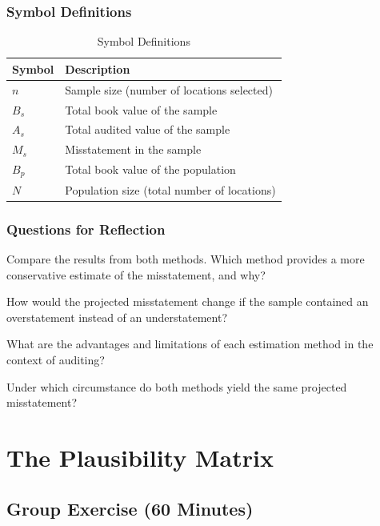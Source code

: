 \documentclass[11pt,a4paper,openany]{memoir}
\begin{document}
\subsection*{Symbol Definitions}
\begin{table}[htbp]
\centering
\caption{Symbol Definitions}
\label{tab:symbol_definitions}
\begin{tabularx}{\textwidth}{@{}lX@{}}
\toprule
\textbf{Symbol} & \textbf{Description} \\
\midrule
$n$ & Sample size (number of locations selected) \\
$B_s$ & Total book value of the sample \\
$A_s$ & Total audited value of the sample \\
$M_s$ & Misstatement in the sample \\
$B_p$ & Total book value of the population \\
$N$ & Population size (total number of locations) \\
\bottomrule
\end{tabularx}
\end{table}

\subsection*{Questions for Reflection}
\begin{compactitem}
    \item Compare the results from both methods. Which method provides a more conservative estimate of the misstatement, and why?
    \item How would the projected misstatement change if the sample contained an overstatement instead of an understatement?
    \item What are the advantages and limitations of each estimation method in the context of auditing?
    \item Under which circumstance do both methods yield the same projected misstatement?
\end{compactitem}

\chapter{The Plausibility Matrix}

\section*{Group Exercise (60 Minutes)}
\end{document}
